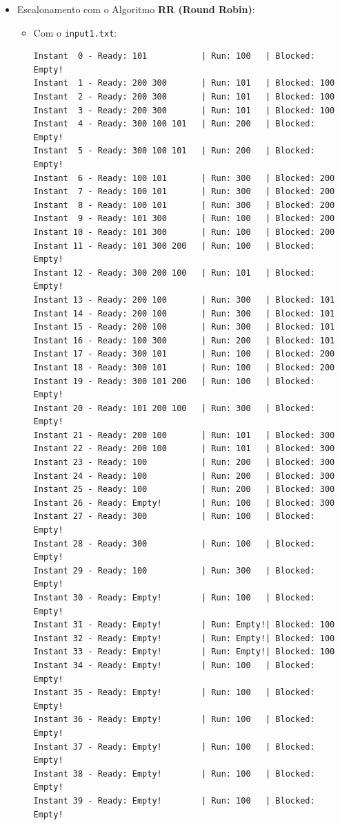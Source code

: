 \documentclass[11pt]{article}   %
\begin{document}
\begin{itemize}
\begin{itemize}
\begin{verbatim}
        \end{verbatim}
    \end{itemize}
    \newpage
    \item Escalonamento com o Algoritmo \textbf{RR (Round Robin)}:
    \begin{itemize}
        \item Com o \verb|input1.txt|:
        \begin{verbatim}
Instant  0 - Ready: 101           | Run: 100   | Blocked: Empty!
Instant  1 - Ready: 200 300       | Run: 101   | Blocked: 100 
Instant  2 - Ready: 200 300       | Run: 101   | Blocked: 100 
Instant  3 - Ready: 200 300       | Run: 101   | Blocked: 100 
Instant  4 - Ready: 300 100 101   | Run: 200   | Blocked: Empty!
Instant  5 - Ready: 300 100 101   | Run: 200   | Blocked: Empty!
Instant  6 - Ready: 100 101       | Run: 300   | Blocked: 200 
Instant  7 - Ready: 100 101       | Run: 300   | Blocked: 200 
Instant  8 - Ready: 100 101       | Run: 300   | Blocked: 200 
Instant  9 - Ready: 101 300       | Run: 100   | Blocked: 200 
Instant 10 - Ready: 101 300       | Run: 100   | Blocked: 200 
Instant 11 - Ready: 101 300 200   | Run: 100   | Blocked: Empty!
Instant 12 - Ready: 300 200 100   | Run: 101   | Blocked: Empty!
Instant 13 - Ready: 200 100       | Run: 300   | Blocked: 101 
Instant 14 - Ready: 200 100       | Run: 300   | Blocked: 101 
Instant 15 - Ready: 200 100       | Run: 300   | Blocked: 101 
Instant 16 - Ready: 100 300       | Run: 200   | Blocked: 101 
Instant 17 - Ready: 300 101       | Run: 100   | Blocked: 200 
Instant 18 - Ready: 300 101       | Run: 100   | Blocked: 200 
Instant 19 - Ready: 300 101 200   | Run: 100   | Blocked: Empty!
Instant 20 - Ready: 101 200 100   | Run: 300   | Blocked: Empty!
Instant 21 - Ready: 200 100       | Run: 101   | Blocked: 300 
Instant 22 - Ready: 200 100       | Run: 101   | Blocked: 300 
Instant 23 - Ready: 100           | Run: 200   | Blocked: 300 
Instant 24 - Ready: 100           | Run: 200   | Blocked: 300 
Instant 25 - Ready: 100           | Run: 200   | Blocked: 300 
Instant 26 - Ready: Empty!        | Run: 100   | Blocked: 300 
Instant 27 - Ready: 300           | Run: 100   | Blocked: Empty!
Instant 28 - Ready: 300           | Run: 100   | Blocked: Empty!
Instant 29 - Ready: 100           | Run: 300   | Blocked: Empty!
Instant 30 - Ready: Empty!        | Run: 100   | Blocked: Empty!
Instant 31 - Ready: Empty!        | Run: Empty!| Blocked: 100 
Instant 32 - Ready: Empty!        | Run: Empty!| Blocked: 100 
Instant 33 - Ready: Empty!        | Run: Empty!| Blocked: 100 
Instant 34 - Ready: Empty!        | Run: 100   | Blocked: Empty!
Instant 35 - Ready: Empty!        | Run: 100   | Blocked: Empty!
Instant 36 - Ready: Empty!        | Run: 100   | Blocked: Empty!
Instant 37 - Ready: Empty!        | Run: 100   | Blocked: Empty!
Instant 38 - Ready: Empty!        | Run: 100   | Blocked: Empty!
Instant 39 - Ready: Empty!        | Run: 100   | Blocked: Empty!           
        \end{verbatim}
    \end{itemize}
\end{itemize}
\end{document}
